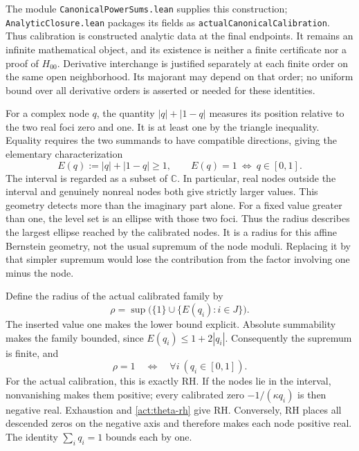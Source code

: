 The module \texttt{CanonicalPowerSums.lean} supplies this construction;
\texttt{AnalyticClosure.lean} packages its fields as
\texttt{actualCanonicalCalibration}. Thus calibration is constructed
analytic data at the final endpoints. It remains an infinite mathematical
object, and its existence is neither a finite certificate nor a proof of
$H_{00}$.
Derivative interchange is justified separately at each finite order on
the same open neighborhood. Its majorant may depend on that order;
no uniform bound over all derivative orders is asserted or needed
for these identities.

\label{act:radius}
For a complex node $q$, the quantity $|q|+|1-q|$ measures its position
relative to the two real foci zero and one. It is at least one by the
triangle inequality. Equality requires the two summands to have compatible
directions, giving the elementary characterization
\begin{equation}\label{act:segment-geometry}
 E(q):=|q|+|1-q|\ge1,\qquad
 E(q)=1\ \Longleftrightarrow\ q\in[0,1].
\end{equation}
The interval is regarded as a subset of $\mathbb C$. In particular,
real nodes outside the interval and genuinely nonreal nodes both give
strictly larger values. This geometry detects more than the imaginary
part alone.
For a fixed value greater than one, the level set is an ellipse with
those two foci. Thus the radius describes the largest ellipse reached
by the calibrated nodes. It is a radius for this affine Bernstein
geometry, not the usual supremum of the node moduli. Replacing it
by that simpler supremum would lose the contribution from the
factor involving one minus the node.

Define the radius of the actual calibrated family by
\begin{equation}\label{act:spectral-radius}
 \rho=\sup\bigl(\{1\}\cup\{E(q_i):i\in J\}\bigr).
\end{equation}
The inserted value one makes the lower bound explicit. Absolute
summability makes the family bounded, since
$E(q_i)\le1+2|q_i|$. Consequently the supremum is finite, and
\begin{equation}\label{act:radius-one}
 \rho=1\quad\Longleftrightarrow\quad \forall i\ (q_i\in[0,1]).
\end{equation}
For the actual calibration, this is exactly RH. If the nodes lie in the
interval, nonvanishing makes them positive; every calibrated zero
$-1/(\kappa q_i)$ is then negative real. Exhaustion and
\eqref{act:theta-rh} give RH. Conversely, RH places all descended zeros
on the negative axis and therefore makes each node positive real.
The identity $\sum_iq_i=1$ bounds each by one.

